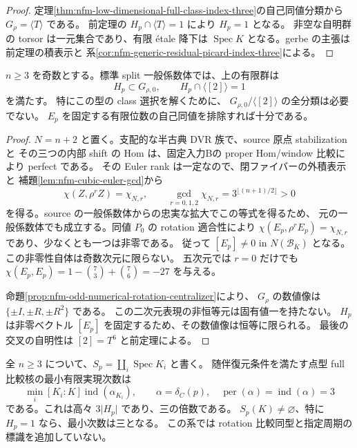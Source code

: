 \begin{proof}
定理\ref{thm:nfm-low-dimensional-full-class-index-three}の自己同値分類から
$G_\rho=\langle T\rangle$ である。
前定理の $H_p\cap\langle T\rangle=1$ により $H_p=1$ となる。
非空な自明群の torsor は一元集合であり、有限 \'etale 降下は
$\operatorname{Spec}K$ となる。gerbe の主張は前定理の積表示と
系\ref{cor:nfm-generic-residual-picard-index-three}による。
\end{proof}

\begin{corollary}[奇数次元の有限安定化群は数値的に自明である]
\label{cor:nfm-odd-finite-stabilizer-numerical}
$n\ge3$ を奇数とする。標準 split 一般係数体では、上の有限群は
\[
 H_p\subset G_{\rho,0},\qquad H_p\cap\langle[2]\rangle=1
\]
を満たす。
特にこの型の class 選択を解くために、
$G_{\rho,0}/\langle[2]\rangle$ の全分類は必要でない。
$E_p$ を固定する有限位数の自己同値を排除すれば十分である。
\end{corollary}

\begin{proof}
$N=n+2$ と置く。支配的な半古典 DVR 族で、source 原点 stabilization と
その三つの内部 shift の Hom は、固定入力Bの proper Hom/window 比較により perfect である。
その Euler rank は一定なので、閉ファイバーの外積表示と
補題\ref{lem:nfm-cubic-euler-gcd}から
\[
 \chi(Z,\rho^rZ)=\chi_{N,r},\qquad
 \gcd_{r=0,1,2}\chi_{N,r}=3^{\lfloor(n+1)/2\rfloor}>0
\]
を得る。source の一般係数体からの忠実な拡大でこの等式を得るため、
元の一般係数体でも成立する。同値 $P_0$ の rotation 適合性により
$\chi(E_p,\rho^rE_p)=\chi_{N,r}$ であり、少なくとも一つは非零である。
従って $[E_p]\ne0$ in $N(\mathcal B_{\overline K})$ となる。
この非零性自体は奇数次元に限らない。
五次元では $r=0$ だけでも
$\chi(E_p,E_p)=1-\binom73+\binom76=-27$ を与える。

命題\ref{prop:nfm-odd-numerical-rotation-centralizer}により、
$G_\rho$ の数値像は $\{\pm I,\pm R,\pm R^2\}$ である。
この二次元表現の非恒等元は固有値一を持たない。
$H_p$ は非零ベクトル $[E_p]$ を固定するため、その数値像は恒等に限られる。
最後の交叉の自明性は $[2]=T^6$ と前定理による。
\end{proof}

\begin{corollary}
\label{cor:nfm-adjoint-point-realization-degree}
全 $n\ge3$ について、$S_p=\coprod_i\operatorname{Spec}K_i$ と書く。
随伴復元条件を満たす点型 full 比較核の最小有限実現次数は
\[
 \min_i [K_i:K]\operatorname{ind}(\alpha_{K_i}),
 \qquad \alpha=\delta_C(p),\quad\operatorname{per}(\alpha)=\operatorname{ind}(\alpha)=3
\]
である。これは高々 $3\lvert H_p\rvert$ であり、三の倍数である。
$S_p(K)\ne\varnothing$、特に $H_p=1$ なら、最小次数は三となる。
この系では rotation 比較同型と指定周期の標識を追加していない。
\end{corollary}

